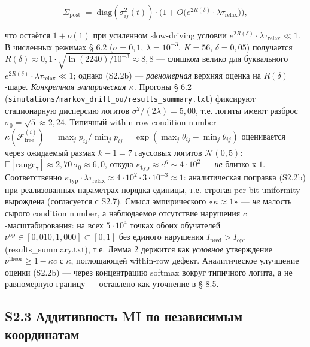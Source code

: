 \documentclass[pdflatex,sn-mathphys-ay]{sn-jnl}
\begin{document}
\begin{equation}\Sigma_{\text{post}} \;=\; \text{diag}(\sigma_{ij}^2(t)) \cdot \bigl(1 + O\bigl(e^{2R(\delta)} \cdot \lambda \tau_{\text{relax}}\bigr)\bigr), \tag{S2.2b}\end{equation}



что остаётся \(1 + o(1)\) при усиленном slow-driving условии \(e^{2R(\delta)} \cdot \lambda \tau_{\text{relax}} \ll 1\). В численных режимах § 6.2 (\(\sigma = 0{,}1\), \(\lambda = 10^{-3}\), \(K = 56\), \(\delta = 0{,}05\)) получается \(R(\delta) \approx 0{,}1 \cdot \sqrt{\ln(2240) / 10^{-3}} \approx 8{,}8\) --- слишком велико для буквального \(e^{2R(\delta)} \cdot \lambda \tau_{\text{relax}} \ll 1\); однако (S2.2b) --- \emph{равномерная} верхняя оценка на \(R(\delta)\)-шаре. \emph{Конкретная эмпирическая \(\kappa\).} Прогоны § 6.2 (\texttt{simulations/markov\_drift\_ou/results\_summary.txt}) фиксируют стационарную дисперсию логитов \(\sigma^2/(2\lambda) = 5{,}00\), т.е. логиты имеют разброс \(\sigma_0 = \sqrt5 \approx 2{,}24\). Типичный within-row condition number \(\kappa(\mathcal{F}^{(i)}_{\text{free}}) = \max_j p_{ij}/\min_j p_{ij} = \exp(\max_j\theta_{ij} - \min_j\theta_{ij})\) оценивается через ожидаемый размах \(k-1 = 7\) гауссовых логитов \(\mathcal{N}(0, 5)\): \(\mathbb{E}[\text{range}_7] \approx 2{,}70\,\sigma_0 \approx 6{,}0\), откуда \(\kappa_{\text{typ}} \approx e^{6} \sim 4\cdot 10^{2}\) --- \emph{не} близко к \(1\). Соответственно \(\kappa_{\text{typ}}\cdot\lambda\tau_{\text{relax}} \approx 4\cdot10^2 \cdot 3\cdot10^{-3} \approx 1\): аналитическая поправка (S2.2b) при реализованных параметрах порядка единицы, т.е. строгая per-bit-uniformity вырождена (согласуется с S2.7). Смысл эмпирического «\(\kappa \approx 1\)» --- \emph{не} малость сырого condition number, а наблюдаемое отсутствие нарушения \(c\)-масштабирования: на всех \(5\cdot 10^4\) точках обоих обучателей \(\nu^{\text{op}}\in[0{,}010, 1{,}000]\subset[0,1]\) без единого нарушения \(I_{\text{pred}} > I_{\text{opt}}\) (results\_summary.txt), т.е. Лемма 2 держится как \emph{условное} утверждение \(\nu^{\text{theor}}\ge 1-\kappa c\) с \(\kappa\), поглощающей within-row дефект. Аналитическое улучшение оценки (S2.2b) --- через концентрацию softmax вокруг типичного логита, а не равномерную границу --- оставлено как уточнение в § 8.5.



\subsection*{S2.3 Аддитивность MI по независимым координатам}\label{s2.3-ux430ux434ux434ux438ux442ux438ux432ux43dux43eux441ux442ux44c-mi-ux43fux43e-ux43dux435ux437ux430ux432ux438ux441ux438ux43cux44bux43c-ux43aux43eux43eux440ux434ux438ux43dux430ux442ux430ux43c}
\end{document}
